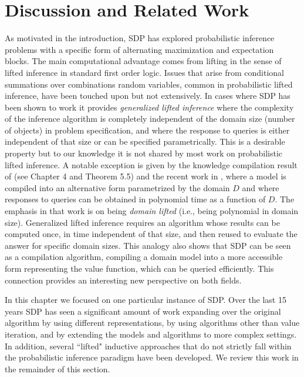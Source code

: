 %

\section{Discussion and Related Work}

%
%
%
%
%
%
%
%
%

%

%
%

As motivated in the introduction, SDP has explored probabilistic inference problems with a specific form of alternating maximization and expectation blocks. The main computational advantage comes from lifting in the sense of lifted inference in standard first order logic. Issues that arise from conditional summations over combinations random variables,  common in probabilistic lifted inference, have been touched upon but not extensively. In cases where SDP has been shown to work it provides {\em generalized lifted inference} where the complexity of the inference algorithm is completely independent of the domain size (number of objects) in problem specification, and where the response to queries is either independent of that size or can be specified parametrically. 
This is a desirable property but to our knowledge it is not shared by most work on probabilistic lifted inference. A notable exception is given by the knowledge compilation result of \cite{vandenbroeck-thesis} (see Chapter 4 and Theorem 5.5) 
and the recent work in \cite{KazemiP16,KazemiKBP16}, where a model is compiled into an alternative form parametrized by the domain $D$ and where responses to queries can be obtained in polynomial time as a function of $D$. 
The emphasis in that work is on being {\em domain lifted} (i.e., being polynomial in domain size). Generalized lifted inference requires an algorithm whose results can be computed once, in time independent of that size, and then reused to evaluate the answer for specific domain sizes.
This analogy also shows that SDP can be seen as a compilation algorithm, compiling a domain model into  a more accessible form representing the value function, which can be queried efficiently. 
This connection provides an interesting new perspective on both fields.

In this chapter we focused on one particular instance of SDP. 
Over the last 15 years SDP has seen a significant amount of work expanding over the original algorithm 
by using different representations, by using algorithms other than value iteration, and by extending the models and algorithms to more complex settings. In addition, several ``lifted" inductive approaches that do not strictly fall within the probabilistic inference paradigm have been developed. 
We review this work in the remainder of this section. 

